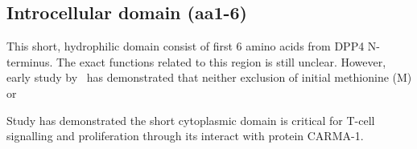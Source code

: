 \subsection{Introcellular domain (aa1-6)}

This short, hydrophilic domain consist of first 6 amino acids from DPP4 N-terminus. The exact functions related to this region is still unclear. However, early study by~\citet{Hong1990} has demonstrated that neither exclusion of initial methionine (M) or 

Study has demonstrated the short cytoplasmic domain is critical for T-cell signalling and proliferation through its interact with protein CARMA-1. \cite{Ohnuma_2007}